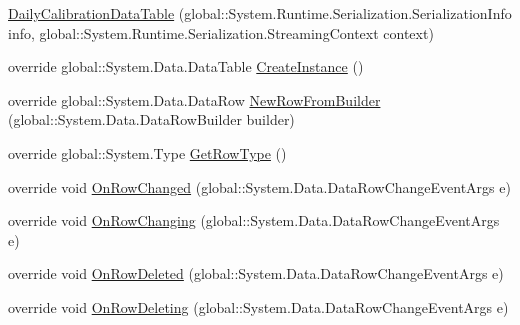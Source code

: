 \begin{DoxyCompactItemize}
\item 
\hyperlink{class_env_int_1_1_win32_1_1_field_tech_1_1_manager_1_1_data_sets_1_1_guide_ware_mobile_data_set_5b380d875f3f569d74f6183f0c2ee8d7_af63fac12642aa3387edd7a908f8cfed6}{Daily\+Calibration\+Data\+Table} (global\+::\+System.\+Runtime.\+Serialization.\+Serialization\+Info info, global\+::\+System.\+Runtime.\+Serialization.\+Streaming\+Context context)
\item 
override global\+::\+System.\+Data.\+Data\+Table \hyperlink{class_env_int_1_1_win32_1_1_field_tech_1_1_manager_1_1_data_sets_1_1_guide_ware_mobile_data_set_5b380d875f3f569d74f6183f0c2ee8d7_a6017a8fe58bf41b26e95ccf095791865}{Create\+Instance} ()
\item 
override global\+::\+System.\+Data.\+Data\+Row \hyperlink{class_env_int_1_1_win32_1_1_field_tech_1_1_manager_1_1_data_sets_1_1_guide_ware_mobile_data_set_5b380d875f3f569d74f6183f0c2ee8d7_af392db4a8cd589d1bf5202e04f9ef907}{New\+Row\+From\+Builder} (global\+::\+System.\+Data.\+Data\+Row\+Builder builder)
\item 
override global\+::\+System.\+Type \hyperlink{class_env_int_1_1_win32_1_1_field_tech_1_1_manager_1_1_data_sets_1_1_guide_ware_mobile_data_set_5b380d875f3f569d74f6183f0c2ee8d7_adeeffed383450f0568e97d829f443ae0}{Get\+Row\+Type} ()
\item 
override void \hyperlink{class_env_int_1_1_win32_1_1_field_tech_1_1_manager_1_1_data_sets_1_1_guide_ware_mobile_data_set_5b380d875f3f569d74f6183f0c2ee8d7_a107dad9310b57f8f496cb9d81d4bdd1a}{On\+Row\+Changed} (global\+::\+System.\+Data.\+Data\+Row\+Change\+Event\+Args e)
\item 
override void \hyperlink{class_env_int_1_1_win32_1_1_field_tech_1_1_manager_1_1_data_sets_1_1_guide_ware_mobile_data_set_5b380d875f3f569d74f6183f0c2ee8d7_a66250d57ed7f2bb7792a9da90d1337fe}{On\+Row\+Changing} (global\+::\+System.\+Data.\+Data\+Row\+Change\+Event\+Args e)
\item 
override void \hyperlink{class_env_int_1_1_win32_1_1_field_tech_1_1_manager_1_1_data_sets_1_1_guide_ware_mobile_data_set_5b380d875f3f569d74f6183f0c2ee8d7_a208ff57a84a3cb9a324916cb1f297831}{On\+Row\+Deleted} (global\+::\+System.\+Data.\+Data\+Row\+Change\+Event\+Args e)
\item 
override void \hyperlink{class_env_int_1_1_win32_1_1_field_tech_1_1_manager_1_1_data_sets_1_1_guide_ware_mobile_data_set_5b380d875f3f569d74f6183f0c2ee8d7_a3ef54fb6f1859c619e22114247737e84}{On\+Row\+Deleting} (global\+::\+System.\+Data.\+Data\+Row\+Change\+Event\+Args e)
\item 

\end{DoxyCompactItemize}
